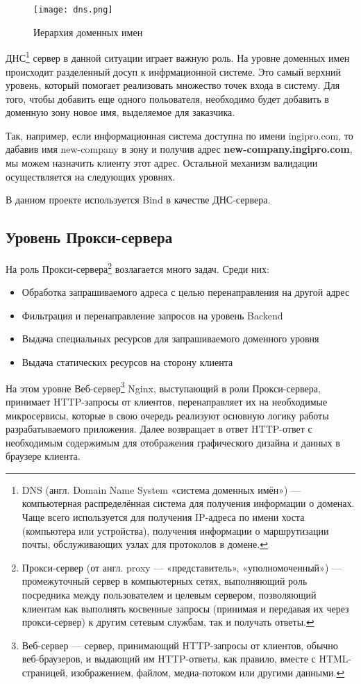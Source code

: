 \begin{figure}[H]
\centering
\texttt{[image: dns.png]}
\caption{Иерархия доменных имен}
\label{img:domains}
\end{figure}

ДНС\footnote{%
	DNS (англ. Domain Name System «система доменных имён») — компьютерная распределённая система для получения информации о доменах. Чаще всего используется для получения IP-адреса по имени хоста (компьютера или устройства), получения информации о маршрутизации почты, обслуживающих узлах для протоколов в домене.
} сервер в данной ситуации играет важную роль. На уровне доменных имен происходит разделенный досуп к инфрмационной системе. Это самый верхний уровень, который помогает реализовать множество точек входа в систему. Для того, чтобы добавить еще одного польователя, необходимо будет добавить в доменную зону новое имя, выделяемое для заказчика.

Так, например, если информационная система доступна по имени ingipro.com, то дабавив имя new-company в зону и получив адрес {\bfseries new-company.ingipro.com}, мы можем назначить клиенту этот адрес. Остальной механизм валидации осуществляется на следующих уровнях. 

В данном проекте используется Bind в качестве ДНС-сервера.

\subsection{Уровень Прокси-сервера}

На роль Прокси-сервера\footnote{%
	Прокси-сервер (от англ. proxy — «представитель», «уполномоченный») — промежуточный сервер в компьютерных сетях, выполняющий роль посредника между пользователем и целевым сервером, позволяющий клиентам как выполнять косвенные запросы (принимая и передавая их через прокси-сервер) к другим сетевым службам, так и получать ответы.
} возлагается много задач. Среди них:
\begin{itemize}
\item Обработка запрашиваемого адреса с целью перенаправления на другой адрес
\item Фильтрация и перенаправление запросов на уровень Backend
\item Выдача специальных ресурсов для запрашиваемого доменного уровня
\item Выдача статических ресурсов на сторону клиента
\end{itemize}

На этом уровне Веб-сервер\footnote{%
	Веб-сервер --- сервер, принимающий HTTP-запросы от клиентов, обычно веб-браузеров, и выдающий им HTTP-ответы, как правило, вместе с HTML-страницей, изображением, файлом, медиа-потоком или другими данными.
} Nginx, выступающий в роли Прокси-сервера, принимает HTTP-запросы от клиентов, перенаправляет их на необходимые микросервисы, которые в свою очередь реализуют основную логику работы разрабатываемого приложения. Далее возвращает в ответ HTTP-ответ с необходимым содержимым для отображения графического дизайна и данных в браузере клиента.



